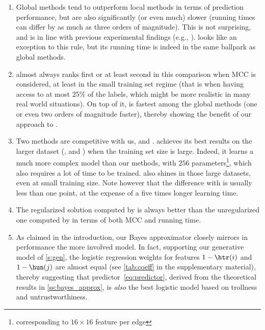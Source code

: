 \begin{enumerate}[leftmargin=2em,label=\textbf{\arabic*.}]

  \item Global methods tend to outperform local methods in terms of prediction performance, but are
    also significantly (or even much) slower (running times can differ by as much as three orders of
    magnitude). This is not surprising, and is in line with previous experimental findings (e.g.,
    \autocites{shahriari2014ranking}{wu2016troll}). \compbayesian{} looks like an exception to this
    rule, but its running time is indeed in the same ballpark as global methods.

  \item \uslpropGsec{} almost always ranks first or at least second in this comparison when MCC is
    considered, at least in the small training set regime (that is when having access to at most
    $25\%$ of the labels, which might be more realistic in many real world situations).
    On top of it, \uslpropGsec{} is fastest among the global methods (one or even two
    orders of magnitude faster), thereby showing the benefit of our approach to \esp{}.

  \item Two methods are competitive with us, \compbayesian{} and \compranknodes{}. \compbayesian{}
    achieves its best results on the larger dataset (\sla{}, \epi{} and \kiw{}) when the training
    set size is large. Indeed, it learns a much more complex model than our methods, with $256$
    parameters\footnote{corresponding to $16\times 16$ feature per edge}, which also requires a lot
    of time to be trained. \compranknodes{} also shines in those large datasets, even at small
    training size. Note however that the difference with \uslpropGsec{} is usually less than one point,
    at the expense of a five times longer learning time.

  \item The regularized solution computed by \uslpropGsec{} is always better than the unregularized
    one computed by \qoptim{} in terms of both MCC and running time.

  \item As claimed in the introduction, our Bayes approximator \usrule{} closely mirrors in
    performance the more involved \uslogregp{} model. In fact, supporting our generative model of
    \autoref{s:gen}, the logistic regression weights for features $1-\htr(i)$ and $1-\hun(j)$
    are almost equal (see \autoref{tab:coeff} in the supplementary material), thereby suggesting that
    predictor~\eqref{eq:predictor}, derived from the theoretical results in
    \autoref{ss:bayes_approx}, is \emph{also} the best logistic model based on trollness and
    untrustworthiness.
\end{enumerate}

